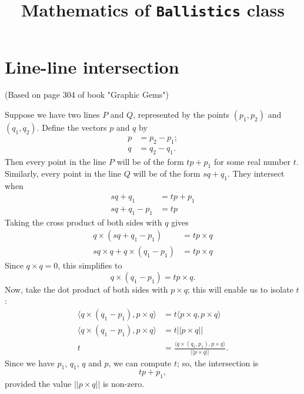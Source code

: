 \documentclass{article}
\begin{document}
\title{Mathematics of \texttt{Ballistics} class}
\date{}
\maketitle

\section{Line-line intersection}

(Based on page 304 of book "Graphic Gems")

Suppose we have two lines $P$ and $Q$,
represented by the points $(p_1, p_2)$ and $(q_1, q_2)$.
Define the vectors $p$ and $q$ by
\begin{align*}
    p &= p_2 - p_1; \\
    q &= q_2 - q_1.
\end{align*}
Then every point in the line $P$ will be of the form $tp + p_1$
for some real number $t$.
Similarly, every point in the line $Q$ will be of the form $sq + q_1$.
They intersect when
\begin{align*}
    sq + q_1 &= tp + p_1 \\
    sq + q_1 - p_1 &= tp
\end{align*}
Taking the cross product of both sides with $q$ gives
\begin{align*}
    q \times (sq + q_1 - p_1) &= t p \times q \\
    s q \times q + q \times (q_1 - p_1) &= t p \times q
\end{align*}
Since $q \times q = 0$, this simplifies to
\begin{equation*}
    q \times (q_1 - p_1) = t p \times q.
\end{equation*}
Now, take the dot product of both sides with $p \times q$;
this will enable us to isolate $t$:
\begin{align*}
    \langle q \times (q_1 - p_1), p \times q \rangle
        &= t \langle p \times q, p \times q \rangle \\
    \langle q \times (q_1 - p_1), p \times q \rangle &= t ||p \times q|| \\
    t &= \frac{\langle q \times(q_1, p_1), p \times q \rangle}{||p \times q||}.
\end{align*}
Since we have $p_1$, $q_1$, $q$ and $p$, we can compute $t$;
so, the intersection is
\begin{equation*}
    tp + p_1,
\end{equation*}
provided the value $|| p \times q ||$ is non-zero.
\end{document}
